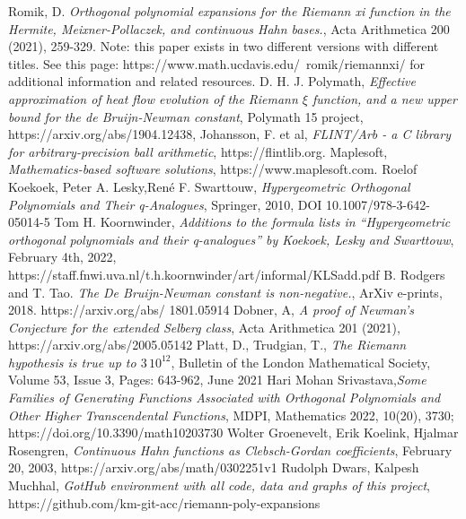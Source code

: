 \documentclass[a4paper,11pt,twoside]{amsart}
\begin{document}
\begin{thebibliography}{} 
Romik, D. \emph{Orthogonal polynomial expansions for the Riemann xi function in the Hermite, Meixner-Pollaczek, and continuous Hahn bases.}, Acta Arithmetica 200 (2021), 259-329.
Note: this paper exists in two different versions with different titles. See this page: https://www.math.ucdavis.edu/~romik/riemannxi/ for additional information and related resources. 
D. H. J. Polymath, \emph{Effective approximation of heat flow evolution of the Riemann $\xi$ function, and a new upper bound for the de Bruijn-Newman constant}, Polymath 15 project, https://arxiv.org/abs/1904.12438, 
Johansson, F. et al, \emph{FLINT/Arb - a C library for arbitrary-precision ball arithmetic}, https://flintlib.org.
Maplesoft, \emph{Mathematics-based software solutions}, https://www.maplesoft.com.
Roelof Koekoek, Peter A. Lesky,René F. Swarttouw, \emph{Hypergeometric Orthogonal Polynomials and Their q-Analogues}, Springer, 2010, DOI 10.1007/978-3-642-05014-5
Tom H. Koornwinder, \emph{Additions to the formula lists in “Hypergeometric orthogonal polynomials and their q-analogues” by Koekoek, Lesky and Swarttouw}, February 4th, 2022, https://staff.fnwi.uva.nl/t.h.koornwinder/art/informal/KLSadd.pdf
B. Rodgers and T. Tao. \emph{The De Bruijn-Newman constant is non-negative.}, ArXiv e-prints, 2018. https://arxiv.org/abs/ 1801.05914
Dobner, A, \emph{A proof of Newman’s Conjecture for the extended Selberg class}, Acta Arithmetica 201 (2021), https://arxiv.org/abs/2005.05142
Platt, D., Trudgian, T., \emph{The Riemann hypothesis is true up to $3\,10^{12}$}, Bulletin of the London Mathematical Society, Volume 53, Issue 3, Pages: 643-962, June 2021
Hari Mohan Srivastava,\emph{Some Families of Generating Functions Associated with Orthogonal Polynomials and Other Higher Transcendental Functions}, MDPI, Mathematics 2022, 10(20), 3730; https://doi.org/10.3390/math10203730
Wolter Groenevelt, Erik Koelink, Hjalmar Rosengren, \emph{Continuous Hahn functions as Clebsch-Gordan coefficients}, February 20, 2003, https://arxiv.org/abs/math/0302251v1
Rudolph Dwars, Kalpesh Muchhal, \emph{GotHub environment with all code, data and graphs of this project}, https://github.com/km-git-acc/riemann-poly-expansions
\end{thebibliography}{} 

\appendix
\appendixpage
\renewcommand{\theequation}{A.\arabic{equation}}
\setcounter{equation}{0}
\end{document}
